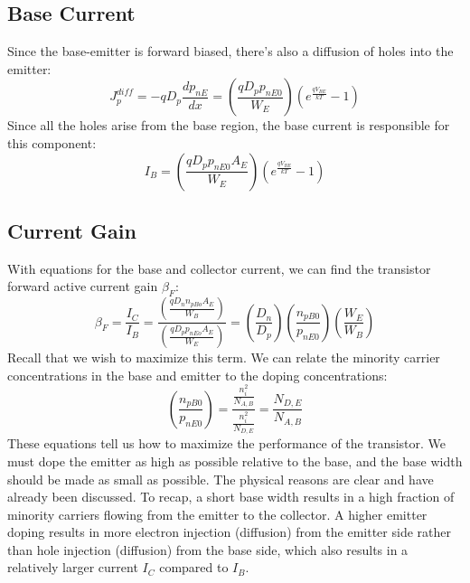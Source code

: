 \subsection{Base Current}
Since the base-emitter is forward biased, there's also a diffusion of holes into the emitter:
    \begin{equation}
        J_p^{diff} =  - q{D_p}\frac{{d{p_{nE}}}}{{dx}} = \left( {\frac{{q{D_p}{p_{nE0}}}}{{{W_E}}}} \right)\left( {{e^{\frac{{q{V_{BE}}}}{{kT}}}} - 1} \right)
    \end{equation}
Since all the holes arise from the base region, the base current is responsible for this component:
    \begin{equation}
        {I_B} = \left( {\frac{{q{D_p}{p_{nE0}}{A_E}}}{{{W_E}}}} \right)\left( {{e^{\frac{{q{V_{BE}}}}{{kT}}}} - 1}\right)
    \end{equation}
\subsection{Current Gain}
With equations for the base and collector current, we can find the transistor forward active current gain $\beta_F$:
    \begin{equation}
        {\beta _F} = \frac{{{I_C}}}{{{I_B}}} = \frac{{\left( {\frac{{q{D_n}{n_{pBo}}{A_E}}}{{{W_B}}}} \right)}}{{\left( {\frac{{q{D_p}{p_{nEo}}{A_E}}}{{{W_E}}}} \right)}} = \left( {\frac{{{D_n}}}{{{D_p}}}} \right)\left( {\frac{{{n_{pB0}}}}{{{p_{nE0}}}}} \right)\left( {\frac{{{W_E}}}{{{W_B}}}} \right)
    \end{equation}
Recall that we wish to maximize this term.  We can relate the minority carrier concentrations in the base and emitter to the doping concentrations:
    \begin{equation}
        \left( {\frac{{{n_{pB0}}}}{{{p_{nE0}}}}} \right) = \frac{{\frac{{n_i^2}}{{{N_{A,B}}}}}}{{\frac{{n_i^2}}	{{{N_{D,E}}}}}} = \frac{{{N_{D,E}}}}{{{N_{A,B}}}}
    \end{equation}
These equations tell us how to maximize the performance of the transistor.  We must dope the emitter as high as possible relative to the base, and the base width should be made as small as possible.  The physical reasons are clear and have already been discussed.  To recap, a short base width results in a high fraction of minority carriers flowing from the emitter to the collector.  A higher emitter doping results in more electron injection (diffusion) from the emitter side rather than hole injection (diffusion) from the base side, which also results in a relatively larger current $I_C$ compared to $I_B$.
